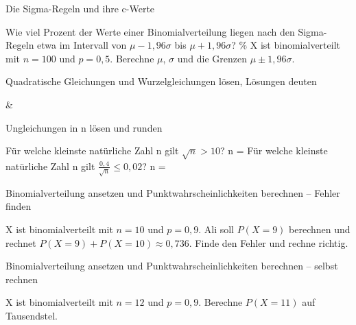 \begin{aufgabe}{Die Sigma-Regeln und ihre c-Werte}
\begin{teile}
\teil Wie viel Prozent der Werte einer Binomialverteilung liegen nach den Sigma-Regeln etwa im Intervall von $\mu - 1{,}96\sigma$ bis $\mu + 1{,}96\sigma$? \leerfeld \%
\teil X ist binomialverteilt mit $n = 100$ und $p = 0{,}5$. Berechne $\mu$, $\sigma$ und die Grenzen $\mu \pm 1{,}96\sigma$.
\end{teile}
\end{aufgabe}

\begin{aufgabe}{Quadratische Gleichungen und Wurzelgleichungen lösen, Lösungen deuten}
\begin{gleichungsraster}[2]
 &
 \\
\end{gleichungsraster}
\end{aufgabe}

\begin{aufgabe}{Ungleichungen in n lösen und runden}
\begin{teile}
\teil Für welche kleinste natürliche Zahl n gilt $\sqrt{n} > 10$? n = \leerfeld
\teil Für welche kleinste natürliche Zahl n gilt $\frac{0{,}4}{\sqrt{n}} \le 0{,}02$? n = \leerfeld
\end{teile}
\end{aufgabe}

\begin{aufgabe}{Binomialverteilung ansetzen und Punktwahrscheinlichkeiten berechnen – Fehler finden}
\begin{teile}
\teil X ist binomialverteilt mit $n = 10$ und $p = 0{,}9$. Ali soll $P(X = 9)$ berechnen und rechnet $P(X = 9) + P(X = 10) \approx 0{,}736$. Finde den Fehler und rechne richtig.
\end{teile}
\end{aufgabe}

\begin{aufgabe}{Binomialverteilung ansetzen und Punktwahrscheinlichkeiten berechnen – selbst rechnen}
\begin{teile}
\teil X ist binomialverteilt mit $n = 12$ und $p = 0{,}9$. Berechne $P(X = 11)$ auf Tausendstel. \leerfeld
\end{teile}
\end{aufgabe}
